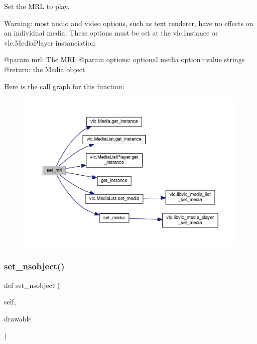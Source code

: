 \begin{DoxyVerb}Set the MRL to play.

Warning: most audio and video options, such as text renderer,
have no effects on an individual media. These options must be
set at the vlc.Instance or vlc.MediaPlayer instanciation.

@param mrl: The MRL
@param options: optional media option=value strings
@return: the Media object
\end{DoxyVerb}
 Here is the call graph for this function\+:
\nopagebreak
\begin{figure}[H]
\begin{center}
\leavevmode
\includegraphics[width=350pt]{classvlc_1_1_media_player_a2c4747c725843bd4ab289d7288838369_cgraph}
\end{center}
\end{figure}
\mbox{\label{classvlc_1_1_media_player_a569de1fbcc475f3eef8dbf4e938851a6}} 
\subsubsection{\texorpdfstring{set\+\_\+nsobject()}{set\_nsobject()}}
{\footnotesize\ttfamily def set\+\_\+nsobject (\begin{DoxyParamCaption}\item[{}]{self,  }\item[{}]{drawable }\end{DoxyParamCaption})}

